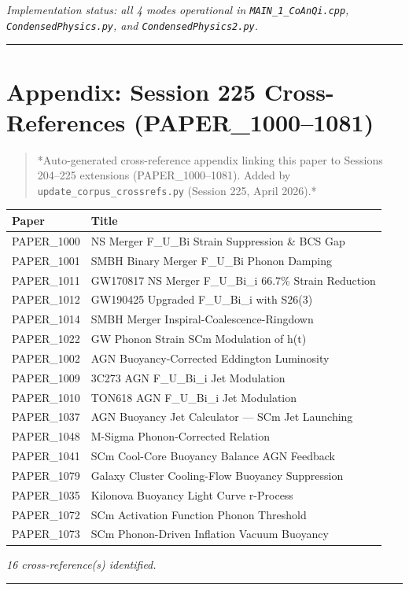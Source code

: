 \documentclass[12pt,a4paper]{article}
\begin{document}
\emph{Implementation status: all 4 modes operational in \texttt{MAIN\_{1\_CoAnQi}.cpp}, \texttt{CondensedPhysics.py}, and \texttt{CondensedPhysics2.py}.}

\medskip\hrule\medskip

\section{Appendix: Session 225 Cross-References (PAPER\_1000--1081)}

\begin{quote}
*Auto-generated cross-reference appendix linking this paper to
Sessions 204--225 extensions (PAPER\_1000--1081). Added by
\texttt{update\_{corpus\_crossrefs}.py} (Session 225, April 2026).*
\end{quote}

\begin{table}[H]
\centering
\small
\begin{tabularx}{\linewidth}{@{}>{\raggedright\arraybackslash}X>{\raggedright\arraybackslash}X@{}}
\toprule
Paper & Title \tabularnewline
\midrule
PAPER\_1000 & NS Merger F\_{U\_Bi} Strain Suppression \& BCS Gap \tabularnewline
PAPER\_1001 & SMBH Binary Merger F\_{U\_Bi} Phonon Damping \tabularnewline
PAPER\_1011 & GW170817 NS Merger F\_{U\_Bi\_i} 66.7\% Strain Reduction \tabularnewline
PAPER\_1012 & GW190425 Upgraded F\_{U\_Bi\_i} with S26(3) \tabularnewline
PAPER\_1014 & SMBH Merger Inspiral-Coalescence-Ringdown \tabularnewline
PAPER\_1022 & GW Phonon Strain SCm Modulation of h(t) \tabularnewline
PAPER\_1002 & AGN Buoyancy-Corrected Eddington Luminosity \tabularnewline
PAPER\_1009 & 3C273 AGN F\_{U\_Bi\_i} Jet Modulation \tabularnewline
PAPER\_1010 & TON618 AGN F\_{U\_Bi\_i} Jet Modulation \tabularnewline
PAPER\_1037 & AGN Buoyancy Jet Calculator --- SCm Jet Launching \tabularnewline
PAPER\_1048 & M-Sigma Phonon-Corrected Relation \tabularnewline
PAPER\_1041 & SCm Cool-Core Buoyancy Balance AGN Feedback \tabularnewline
PAPER\_1079 & Galaxy Cluster Cooling-Flow Buoyancy Suppression \tabularnewline
PAPER\_1035 & Kilonova Buoyancy Light Curve r-Process \tabularnewline
PAPER\_1072 & SCm Activation Function Phonon Threshold \tabularnewline
PAPER\_1073 & SCm Phonon-Driven Inflation Vacuum Buoyancy \tabularnewline
\bottomrule
\end{tabularx}
\end{table}

\emph{16 cross-reference(s) identified.}

\medskip\hrule\medskip
\end{document}
